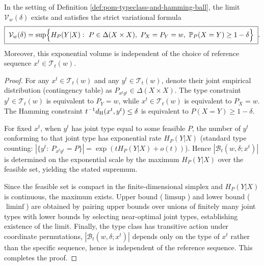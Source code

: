 \begin{theorem}\label{thm:pom-typeclass-hamming-ball-volume-variational}
In the setting of Definition \ref{def:pom-typeclass-and-hamming-ball}, the limit \(\mathcal V_w(\delta)\) exists and satisfies the strict variational formula
\[
\boxed{\;
\mathcal V_w(\delta)
=
\sup\Bigl\{H_P(Y|X):\ P\in\Delta(X\times X),\ P_X=P_Y=w,\ \mathbb P_P(X=Y)\ge 1-\delta\Bigr\}\; }.
\]
Moreover, this exponential volume is independent of the choice of reference sequence \(x^t\in\mathcal T_t(w)\).
\end{theorem}
\begin{proof}
For any \(x^t\in\mathcal T_t(w)\) and any \(y^t\in\mathcal T_t(w)\), denote their joint empirical distribution (contingency table) as \(P_{x^t y^t}\in\Delta(X\times X)\).
The type constraint \(y^t\in\mathcal T_t(w)\) is equivalent to \(P_Y=w\), while \(x^t\in\mathcal T_t(w)\) is equivalent to \(P_X=w\).
The Hamming constraint \(t^{-1}d_{\rm H}(x^t,y^t)\le \delta\) is equivalent to \(P(X=Y)\ge 1-\delta\).
\par
For fixed \(x^t\), when \(y^t\) has joint type equal to some feasible \(P\),
the number of \(y^t\) conforming to that joint type has exponential rate \(H_P(Y|X)\) (standard type counting: \(|\{y^t:\ P_{x^t y^t}=P\}|=\exp(tH_P(Y|X)+o(t))\)).
Hence \(|\mathcal B_t(w,\delta;x^t)|\) is determined on the exponential scale by the maximum \(H_P(Y|X)\) over the feasible set, yielding the stated supremum.
\par
Since the feasible set is compact in the finite-dimensional simplex and \(H_P(Y|X)\) is continuous, the maximum exists.
Upper bound (\(\limsup\)) and lower bound (\(\liminf\)) are obtained by pairing upper bounds over unions of finitely many joint types with lower bounds by selecting near-optimal joint types, establishing existence of the limit.
Finally, the type class has transitive action under coordinate permutations, \(|\mathcal B_t(w,\delta;x^t)|\) depends only on the type of \(x^t\) rather than the specific sequence, hence is independent of the reference sequence. This completes the proof.
\end{proof}

